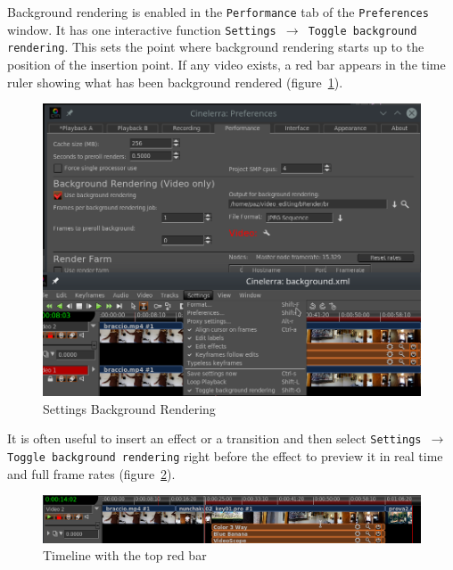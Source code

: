 Background rendering is enabled in the \texttt{Performance} tab of the \texttt{Preferences} window. It has one interactive function \texttt{Settings $\rightarrow$ Toggle background rendering}. This sets the point where background rendering starts up to the position of the insertion point. If any video exists, a red bar appears in the time ruler showing what has been background rendered (figure~\ref{fig:back-ren02}).

\begin{figure}[htpb]
    \centering
    \includegraphics[width=0.8\linewidth]{images/back-ren02.png}
    \caption{Settings Background Rendering}
    \label{fig:back-ren02}
\end{figure}

It is often useful to insert an effect or a transition and then select \texttt{Settings $\rightarrow$ Toggle background rendering} right before the effect to preview it in real time and full frame rates (figure~\ref{fig:back-ren}).

\begin{figure}[htpb]
    \centering
    \includegraphics[width=0.8\linewidth]{images/back-ren.png}
    \caption{Timeline with the top red bar}
    \label{fig:back-ren}
\end{figure}

